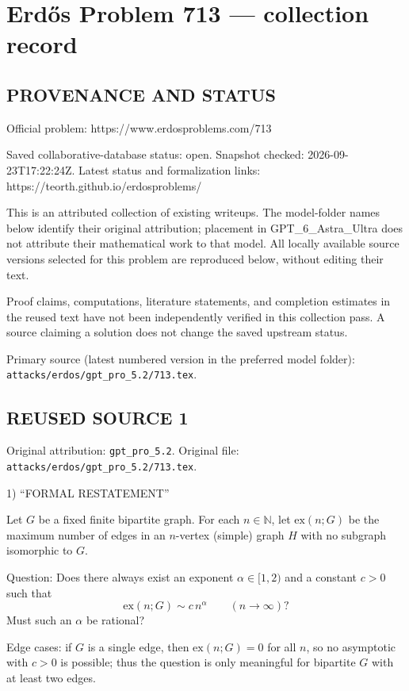 \section*{Erd\H{o}s Problem 713 --- collection record}

\subsection*{PROVENANCE AND STATUS}
Official problem: https://www.erdosproblems.com/713

Saved collaborative-database status: open.
Snapshot checked: 2026-09-23T17:22:24Z.
Latest status and formalization links: https://teorth.github.io/erdosproblems/

This is an attributed collection of existing writeups. The model-folder names below identify their original attribution; placement in GPT\_6\_Astra\_Ultra does not attribute their mathematical work to that model. All locally available source versions selected for this problem are reproduced below, without editing their text.

Proof claims, computations, literature statements, and completion estimates in the reused text have not been independently verified in this collection pass. A source claiming a solution does not change the saved upstream status.

Primary source (latest numbered version in the preferred model folder): \texttt{attacks/erdos/gpt\_pro\_5.2/713.tex}.

\subsection*{REUSED SOURCE 1}
Original attribution: \texttt{gpt\_pro\_5.2}.
Original file: \texttt{attacks/erdos/gpt\_pro\_5.2/713.tex}.


1) “FORMAL RESTATEMENT”

Let $G$ be a fixed finite bipartite graph. For each $n\in\mathbb N$, let $\mathrm{ex}(n;G)$ be the maximum number of edges in an $n$-vertex (simple) graph $H$ with no subgraph isomorphic to $G$.

Question: Does there always exist an exponent $\alpha\in[1,2)$ and a constant $c>0$ such that
\[
\mathrm{ex}(n;G) \sim c\,n^{\alpha}\qquad (n\to\infty)?
\]
Must such an $\alpha$ be rational?

Edge cases: if $G$ is a single edge, then $\mathrm{ex}(n;G)=0$ for all $n$, so no asymptotic with $c>0$ is possible; thus the question is only meaningful for bipartite $G$ with at least two edges.

